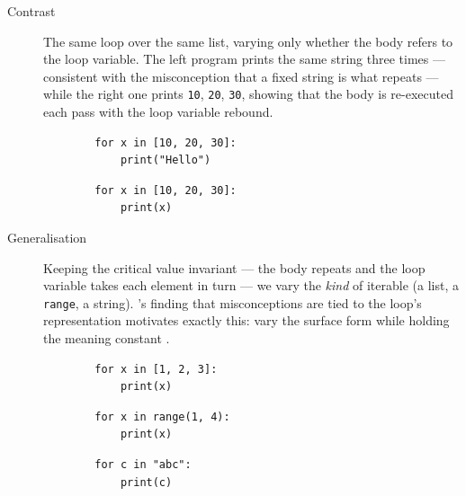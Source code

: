 \begin{description}
  \item[Contrast] The same loop over the same list, varying only whether the
    body refers to the loop variable. The left program prints the same string
    three times --- consistent with the misconception that a fixed string is
    what repeats --- while the right one prints \texttt{10},
    \texttt{20}, \texttt{30}, showing that the body is
    re-executed each pass with the loop variable rebound.

    \hfill
    \begin{minipage}[t]{0.45\columnwidth}
      \begin{verbatim}
        for x in [10, 20, 30]:
            print("Hello")
      \end{verbatim}
    \end{minipage}
    \hfill
    \begin{minipage}[t]{0.45\columnwidth}
      \begin{verbatim}
        for x in [10, 20, 30]:
            print(x)
      \end{verbatim}
    \end{minipage}

  \item[Generalisation] Keeping the critical value invariant --- the body
    repeats and the loop variable takes each element in turn --- we vary the
    \emph{kind} of iterable (a list, a \texttt{range}, a string).
    \citeauthor{Eckert2022Loops}'s finding that misconceptions are tied to the
    loop's representation motivates exactly this: vary the surface form while
    holding the meaning constant \autocite{Eckert2022Loops}.

    \hfill
    \begin{minipage}[t]{0.3\columnwidth}
      \begin{verbatim}
        for x in [1, 2, 3]:
            print(x)
      \end{verbatim}
    \end{minipage}
    \hfill
    \begin{minipage}[t]{0.3\columnwidth}
      \begin{verbatim}
        for x in range(1, 4):
            print(x)
      \end{verbatim}
    \end{minipage}
    \hfill
    \begin{minipage}[t]{0.3\columnwidth}
      \begin{verbatim}
        for c in "abc":
            print(c)
      \end{verbatim}
    \end{minipage}
\end{description}

